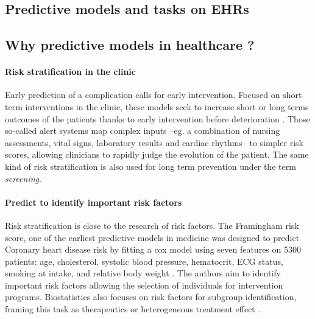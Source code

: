 \documentclass[french,12pt,twoside,a4paper]{book}
\begin{document}
\begin{appendices}
  \section{Predictive models and tasks on EHRs}\label{apd:review_predictions}

  \subsection{Why predictive models in healthcare ?}\label{apd:review_predictive_tasks}%


  \paragraph{Risk stratification in the clinic}

  Early prediction of a complication calls for early intervention. Focused on short
  term interventions in the clinic, these models seek to increase short or long
  terms outcomes of the patients thanks to early intervention before deterioration
  \citep{tang2007global, rothman2013development, wong2021external}. Those so-called alert systems
  \citep{yu2018artificial} map complex inputs --eg. a combination of nursing
  assessments, vital signs, laboratory results and cardiac rhythms-- to simpler
  risk scores, allowing clinicians to rapidly judge the evolution of the patient.
  The same kind of risk stratification is also used for long term prevention under
  the term \emph{screening}.

  \paragraph{Predict to identify important risk factors}

  Risk stratification is close to the research of risk factors.
  The Framingham risk score, one of the earliest predictive models in medicine was
  designed to predict Coronary heart disease risk by fitting a cox model using
  seven features on 5300 patients: age, cholesterol, systolic blood pressure,
  hematocrit, ECG status, smoking at intake, and relative body weight
  \citep{brand1976multivariate}. The authors aim to identify important risk factors
  allowing the selection of individuals for intervention programs.
  Biostatistics also focuses on risk factors for subgroup identification, framing
  this task as therapeutics \citep{steyerberg2009applications} or heterogeneous
  treatment effect \citep{harrell2001regression}.


\end{appendices}
\end{document}
